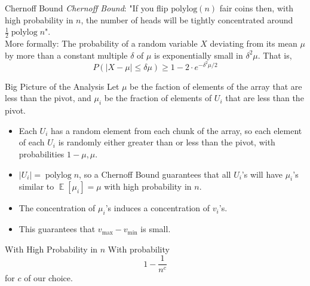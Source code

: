 \documentclass[xcolor=x11names, svgnames, rgb]{beamer}
\newcommand{\polylog}{\operatorname{polylog}}
\def\E{\operatorname{\mathbb{E}}}
\begin{document}
\begin{frame}[t]{Chernoff Bound}
	\vspace{0.5cm}
	\emph{Chernoff Bound}: "If you flip $\text{polylog}(n)$ fair coins then, with high
	probability in $n$, the number of heads will be tightly concentrated around
	$\frac{1}{2}\polylog n$".\\

	\vspace{0.5cm}
	More formally:
	The probability of a random variable $X$ deviating from its mean $\mu$ by more than a constant multiple $\delta$ of $\mu$ is exponentially small in $\delta^2 \mu$. That is, 
	$$P(|X - \mu | \le \delta \mu ) \ge 1- 2\cdot e^{-\delta^2 \mu /2} $$

\end{frame}


\begin{frame}[t]{Big Picture of the Analysis}
	Let $\mu$ be the faction of elements of the array that are less than the pivot, and $\mu_i$ be the fraction of elements of $U_i$ that are less than the pivot.
	\begin{itemize}
		\item Each $U_i$ has a random element from each chunk of the array, so each
			element of each $U_i$ is randomly either greater than or less than the
			pivot, with probabilities $1-\mu, \mu$.
		\item $|U_i| = \polylog n$, so a Chernoff Bound guarantees that all $U_i$'s
			will have $\mu_i$'s similar to $\E[\mu_i] = \mu$ with high probability in $n$.
		\item The concentration of $\mu_i$'s induces a concentration of $v_i$'s. 
		\item This guarantees that $v_{\max} - v_{\min}$ is small. 
	\end{itemize}
\end{frame}

\begin{frame}[t]{With High Probability in $n$}
With probability 	
	$$1- \frac{1}{n^c}$$
	for $c$ of our choice.
\end{frame}
\end{document}
